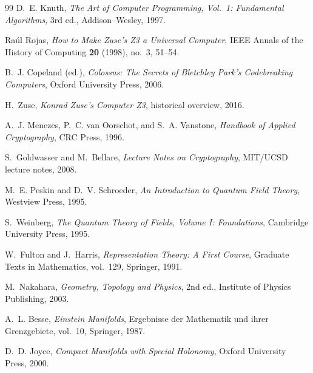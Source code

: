 \begin{thebibliography}{99}
D.~E. Knuth,
\emph{The Art of Computer Programming, Vol.~1: Fundamental Algorithms},
3rd ed., Addison--Wesley, 1997.

Ra\'ul Rojas,
\emph{How to Make Zuse's Z3 a Universal Computer},
IEEE Annals of the History of Computing \textbf{20} (1998), no.~3, 51--54.

B.~J. Copeland (ed.),
\emph{Colossus: The Secrets of Bletchley Park's Codebreaking Computers},
Oxford University Press, 2006.

H.~Zuse,
\emph{Konrad Zuse's Computer Z3},
historical overview, 2016.

A.~J. Menezes, P.~C. van Oorschot, and S.~A. Vanstone,
\emph{Handbook of Applied Cryptography},
CRC Press, 1996.

S.~Goldwasser and M.~Bellare,
\emph{Lecture Notes on Cryptography},
MIT/UCSD lecture notes, 2008.

M.~E. Peskin and D.~V. Schroeder,
\emph{An Introduction to Quantum Field Theory},
Westview Press, 1995.

S.~Weinberg,
\emph{The Quantum Theory of Fields, Volume I: Foundations},
Cambridge University Press, 1995.

W.~Fulton and J.~Harris,
\emph{Representation Theory: A First Course},
Graduate Texts in Mathematics, vol.~129,
Springer, 1991.

M.~Nakahara,
\emph{Geometry, Topology and Physics},
2nd ed., Institute of Physics Publishing, 2003.

A.~L. Besse,
\emph{Einstein Manifolds},
Ergebnisse der Mathematik und ihrer Grenzgebiete, vol.~10,
Springer, 1987.

D.~D. Joyce,
\emph{Compact Manifolds with Special Holonomy},
Oxford University Press, 2000.

\end{thebibliography}


